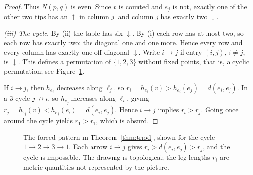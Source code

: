 \documentclass[11pt]{amsart}
\theoremstyle{definition}
\theoremstyle{remark}
\newcommand{\N}{N}
\begin{document}
\begin{proof}
Thus $\N(p,q)$ is even. Since $v$ is counted and $e_j$ is not, exactly one of the other two tips has an $\uparrow$ in column $j$, and column $j$ has exactly two $\downarrow$.

\emph{(iii) The cycle.} By (ii) the table has six $\downarrow$. By (i) each row has at most two, so each row has exactly two: the diagonal one and one more. Hence every row and every column has exactly one off-diagonal $\downarrow$. Write $i\to j$ if entry $(i,j)$, $i\ne j$, is $\downarrow$. This defines a permutation of $\{1,2,3\}$ without fixed points, that is, a cyclic permutation; see Figure~\ref{fig:triod}.

If $i\to j$, then $h_{e_i}$ decreases along $\ell_j$, so $r_i=h_{e_i}(v)>h_{e_i}(e_j)=d(e_i,e_j)$. In a $3$-cycle $j\not\to i$, so $h_{e_j}$ increases along $\ell_i$, giving $r_j=h_{e_j}(v)<h_{e_j}(e_i)=d(e_i,e_j)$. Hence $i\to j$ implies $r_i>r_j$. Going once around the cycle yields $r_1>r_1$, which is absurd.
\end{proof}

\begin{figure}[ht]
\centering
{}
\caption{The forced pattern in Theorem~\ref{thm:triod}, shown for the cycle $1\to2\to3\to1$. Each arrow $i\to j$ gives $r_i>d(e_i,e_j)>r_j$, and the cycle is impossible. The drawing is topological; the leg lengths $r_i$ are metric quantities not represented by the picture.}\label{fig:triod}
\end{figure}
\end{document}
